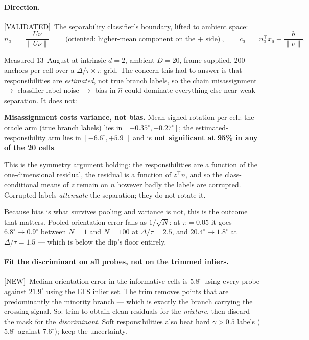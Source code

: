 \documentclass[11pt]{article}
\newcommand{\nhat}{\hat{n}}
\newcommand{\provtag}[2]{{\footnotesize\sffamily\textcolor{#1}{[#2]}}}
\newcommand{\VALID}{\provtag{okgreen}{VALIDATED}}
\newcommand{\NEWT}{\provtag{newmag}{NEW}}
\begin{document}
\paragraph{Direction.} \VALID\ The separability classifier's boundary, lifted to ambient space:
\[
  n_a \;=\; \frac{U\nu}{\lVert U\nu \rVert}
  \qquad\text{(oriented: higher-mean component on the $+$ side)},
  \qquad
  c_a \;=\; n_a^\top x_a + \frac{b}{\lVert\nu\rVert}.
\]

Measured 13~August at intrinsic $d = 2$, ambient $D = 20$, frame supplied, 200 anchors per
cell over a $\Delta/\tau \times \pi$ grid. The concern this had to answer is that
responsibilities are \emph{estimated}, not true branch labels, so the chain
misassignment $\to$ classifier label noise $\to$ bias in $\nhat$ could dominate everything
else near weak separation. It does not:

\begin{resultbox}
\noindent\textbf{\sffamily Misassignment costs variance, not bias.} Mean signed rotation per
cell: the oracle arm (true branch labels) lies in $[-0.35^\circ, +0.27^\circ]$; the
estimated-responsibility arm lies in $[-6.6^\circ, +5.9^\circ]$ and is \textbf{not
significant at 95\% in any of the 20 cells}.

\smallskip
\noindent This is the symmetry argument holding: the responsibilities are a function of the
one-dimensional residual, the residual is a function of $z^\top n$, and so the
class-conditional means of $z$ remain on $n$ however badly the labels are corrupted.
Corrupted labels \emph{attenuate} the separation; they do not rotate it.
\end{resultbox}

\noindent Because bias is what survives pooling and variance is not, this is the outcome
that matters. Pooled orientation error falls as $1/\sqrt{N}$: at $\pi = 0.05$ it goes
$6.8^\circ \to 0.9^\circ$ between $N = 1$ and $N = 100$ at $\Delta/\tau = 2.5$, and
$20.4^\circ \to 1.8^\circ$ at $\Delta/\tau = 1.5$ --- which is below the dip's floor
entirely.

\paragraph{Fit the discriminant on all probes, not on the trimmed inliers.} \NEWT\ Median
orientation error in the informative cells is $5.8^\circ$ using every probe against
$21.9^\circ$ using the LTS inlier set. The trim removes points that are predominantly the
minority branch --- which is exactly the branch carrying the crossing signal. So: trim to
obtain clean residuals for the \emph{mixture}, then discard the mask for the
\emph{discriminant}. Soft responsibilities also beat hard $\gamma > 0.5$ labels
($5.8^\circ$ against $7.6^\circ$); keep the uncertainty.
\end{document}
